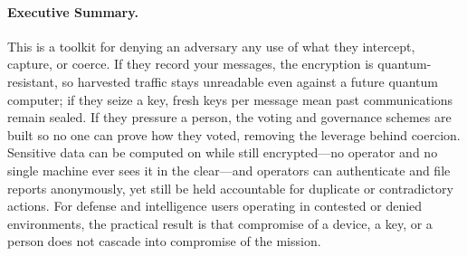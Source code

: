 \documentclass[11pt,letterpaper]{article}
\begin{document}
\makecover

\begin{abstract}
We present a suite of counter-exploitation technologies providing quantum-resistant secure messaging, coercion-resistant governance, confidential computation on encrypted data, and post-quantum anonymous communication. The SessionVM delivers end-to-end encrypted messaging using ML-KEM-768 () and ML-DSA-65 () with fresh key encapsulation per message, achieving 526,000 messages per second with forward secrecy. ThresholdVM provides fully homomorphic encryption (FHE) with GPU-accelerated BFV/BGV/CKKS/TFHE schemes and threshold decryption ensuring no single party observes plaintext. LatticeLSAG ring signatures enable post-quantum anonymous group signing with linkability for double-action detection. Zero-knowledge proof systems provide privacy pools, range proofs, and confidential transactions. A multi-agent adversarial framework with 83 specialized agents enables automated red/blue team operations. Together, these capabilities prevent adversary exploitation of cryptographic, network, and AI systems while maintaining operational security in contested environments.
\end{abstract}

\paragraph{Executive Summary.}
This is a toolkit for denying an adversary any use of what they intercept, capture, or coerce. If they record your messages, the encryption is quantum-resistant, so harvested traffic stays unreadable even against a future quantum computer; if they seize a key, fresh keys per message mean past communications remain sealed. If they pressure a person, the voting and governance schemes are built so no one can prove how they voted, removing the leverage behind coercion. Sensitive data can be computed on while still encrypted---no operator and no single machine ever sees it in the clear---and operators can authenticate and file reports anonymously, yet still be held accountable for duplicate or contradictory actions. For defense and intelligence users operating in contested or denied environments, the practical result is that compromise of a device, a key, or a person does not cascade into compromise of the mission.

\tableofcontents
\newpage

\end{document}
